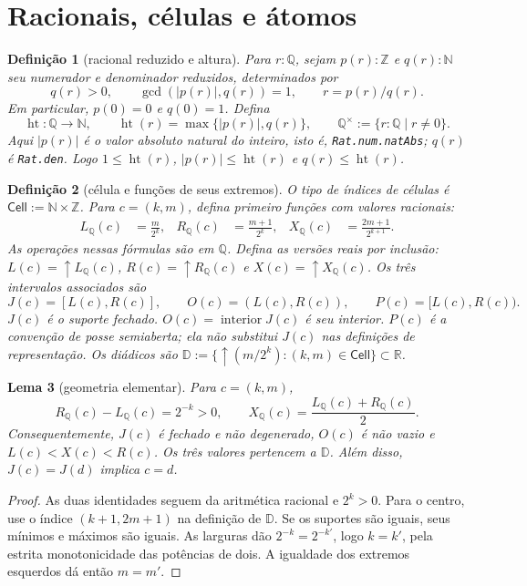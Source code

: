 \documentclass[11pt,a4paper]{article}
\newtheorem{definicao}{Definição}[section]
\newtheorem{lema}[definicao]{Lema}
\newcommand{\N}{\mathbb N}
\newcommand{\Z}{\mathbb Z}
\newcommand{\Q}{\mathbb Q}
\newcommand{\R}{\mathbb R}
\newcommand{\D}{\mathbb D}
\newcommand{\Cell}{\mathsf{Cell}}
\newcommand{\htq}{\operatorname{ht}}
\newcommand{\qstar}{\Q^{\times}}
\newcommand{\intr}{\operatorname{interior}}
\newcommand{\code}[1]{\nolinkurl{#1}}
\begin{document}
\section{Racionais, células e átomos}
\label{sec:objects}

\begin{definicao}[racional reduzido e altura]
Para $r:\Q$, sejam $p(r):\Z$ e $q(r):\N$ seu numerador e denominador
reduzidos, determinados por
\[
 q(r)>0,\qquad \gcd(|p(r)|,q(r))=1,\qquad r=p(r)/q(r).
\]
Em particular, $p(0)=0$ e $q(0)=1$. Defina
\[
 \htq:\Q\to\N,\qquad \htq(r)=\max\{|p(r)|,q(r)\},\qquad
 \qstar:=\{r:\Q\mid r\ne0\}.
\]
Aqui $|p(r)|$ é o valor absoluto natural do inteiro, isto é,
\code{Rat.num.natAbs}; $q(r)$ é \code{Rat.den}. Logo
$1\le\htq(r)$, $|p(r)|\le\htq(r)$ e $q(r)\le\htq(r)$.
\end{definicao}

\begin{definicao}[célula e funções de seus extremos]
O tipo de índices de células é $\Cell:=\N\times\Z$. Para $c=(k,m)$,
defina primeiro funções com valores racionais:
\begin{align*}
 L_\Q(c)&=\frac{m}{2^k},&
 R_\Q(c)&=\frac{m+1}{2^k},&
 X_\Q(c)&=\frac{2m+1}{2^{k+1}}.
\end{align*}
As operações nessas fórmulas são em $\Q$. Defina as versões reais por
inclusão: $L(c)=\uparrow L_\Q(c)$, $R(c)=\uparrow R_\Q(c)$ e
$X(c)=\uparrow X_\Q(c)$. Os três intervalos associados são
\[
 J(c)=[L(c),R(c)],\qquad O(c)=(L(c),R(c)),\qquad
 P(c)=[L(c),R(c)).
\]
$J(c)$ é o suporte fechado. $O(c)=\intr J(c)$ é seu interior.
$P(c)$ é a convenção de posse semiaberta; ela não substitui $J(c)$
nas definições de representação.
Os diádicos são
$\D:=\{\uparrow(m/2^k):(k,m)\in\Cell\}\subset\R$.
\end{definicao}

\begin{lema}[geometria elementar]\label{lem:geometry}
Para $c=(k,m)$,
\[
 R_\Q(c)-L_\Q(c)=2^{-k}>0,\qquad
 X_\Q(c)=\frac{L_\Q(c)+R_\Q(c)}2.
\]
Consequentemente, $J(c)$ é fechado e não degenerado, $O(c)$ é não
vazio e $L(c)<X(c)<R(c)$. Os três valores pertencem a $\D$.
Além disso, $J(c)=J(d)$ implica $c=d$.
\end{lema}
\begin{proof}
As duas identidades seguem da aritmética racional e $2^k>0$.
Para o centro, use o índice $(k+1,2m+1)$ na definição de $\D$.
Se os suportes são iguais, seus mínimos e máximos são iguais.
As larguras dão $2^{-k}=2^{-k'}$, logo $k=k'$, pela estrita
monotonicidade das potências de dois. A igualdade dos extremos
esquerdos dá então $m=m'$.
\end{proof}
\end{document}
